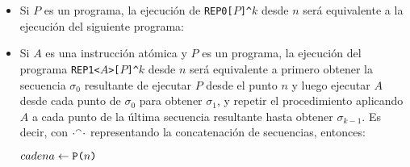 \begin{itemize}
\item Si $P$ es un programa, la ejecución de \verb#REP0[#$P$\verb#]^#$k$ desde $n$ será equivalente a la ejecución del siguiente programa: 

\begin{center}

\begin{algorithm}
\end{algorithm}
\end{center}



\item Si $A$ es una instrucción atómica y $P$ es un programa, la ejecución del programa 
\verb#REP1<#$A$\verb#>[#$P$\verb#]^#$k$ desde $n$ será equivalente a primero obtener la secuencia $\sigma_0$ resultante de ejecutar $P$ desde el punto $n$  y luego ejecutar $A$ desde cada punto de $\sigma_0$ para obtener $\sigma_1$, y repetir el procedimiento aplicando $A$ a cada punto de la última secuencia resultante hasta obtener $\sigma_{k-1}$. Es decir, con $\cdot{}^\smallfrown\cdot$ representando la concatenación de secuencias, entonces:

\begin{center}
\begin{algorithm}
  $cadena \leftarrow \FuncSty{P(}n\FuncSty{)}$\;
  \;
\end{algorithm}
\end{center}



      

\end{itemize}
